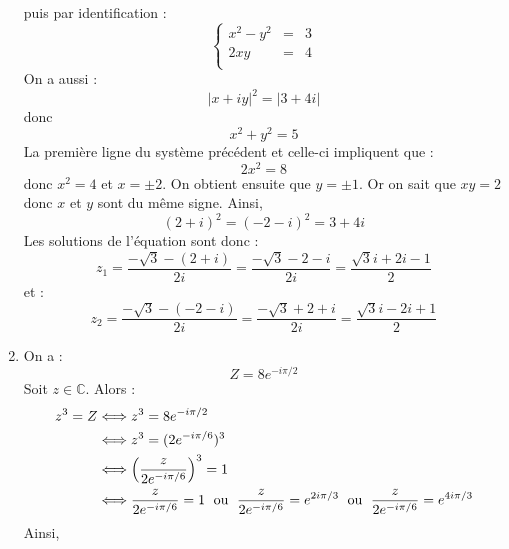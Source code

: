 \documentclass[a4paper,twoside,french,10pt]{VcCours}
\begin{document}
\begin{enumerate}
puis par identification :
$$ \left\lbrace \begin{array}{rcl}
x^2-y^2 & =& 3 \\
2xy & = & 4\\
\end{array}\right.$$
On a aussi :
$$ \vert x+iy \vert^2=\vert 3+4i \vert$$
donc 
$$ x^2+y^2 = 5$$
La première ligne du système précédent et celle-ci impliquent que :
$$ 2x^2 = 8$$
donc $x^2=4$ et $x = \pm 2$. On obtient ensuite que $y= \pm 1$. Or on sait que $xy=2$ donc $x$ et $y$ sont du même signe. Ainsi,
$$ (2+i)^2 = (-2-i)^2 = 3+4i$$
Les solutions de l'équation sont donc :
$$ z_1 = \dfrac{- \sqrt{3}- (2+i)}{2i} = \dfrac{-\sqrt{3}-2-i}{2i} = \boxed{\dfrac{\sqrt{3}i + 2i-1}{2}}$$
et :
$$ z_2 = \dfrac{- \sqrt{3}- (-2-i)}{2i} = \dfrac{-\sqrt{3}+2+i}{2i} = \boxed{\dfrac{\sqrt{3}i - 2i+1}{2}}$$
\item On a :
$$ Z = 8 e^{-i \pi/2}$$
Soit $z \in \mathbb{C}$. Alors :
\begin{align*}
z^3 = Z & \Longleftrightarrow z^3 = 8 e^{-i \pi/2} \\
& \Longleftrightarrow z^3 = (2e^{-i \pi/6})^3 \\
& \Longleftrightarrow \left( \dfrac{z}{2e^{-i \pi/6}} \right)^3 = 1 \\
& \Longleftrightarrow  \dfrac{z}{2e^{-i \pi/6}} = 1 \; \hbox{ ou }  \; \dfrac{z}{2e^{-i \pi/6}} = e^{2i \pi/3}  \; \hbox{ ou }  \; \dfrac{z}{2e^{-i \pi/6}} = e^{4i \pi/3} 
\end{align*}
Ainsi,
\end{enumerate}

\medskip
\end{document}
